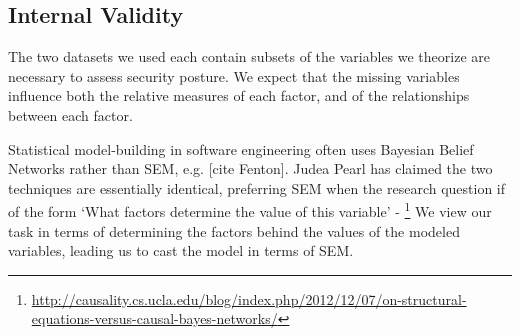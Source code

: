 \subsection{Internal Validity}

The two datasets we used each contain subsets of the variables we theorize are necessary to assess security posture. We expect that the missing variables influence both the relative measures of each factor, and of the relationships between each factor. 

Statistical model-building in software engineering often uses Bayesian Belief Networks rather than SEM, e.g. [cite Fenton]. Judea Pearl has claimed the two techniques are essentially identical, preferring SEM when the research question if of the form `What factors determine the value of this variable' - \footnote{\url{http://causality.cs.ucla.edu/blog/index.php/2012/12/07/on-structural-equations-versus-causal-bayes-networks/}} We view our task in terms of determining the factors behind the values of the modeled variables, leading us to cast the model in terms of SEM.